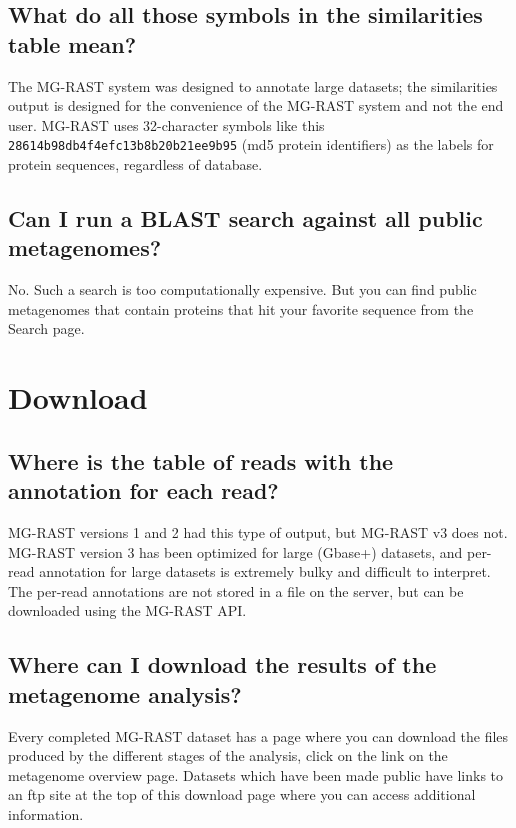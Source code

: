 \documentclass[12pt,fullpage]{report}
\begin{document}
\subsection{What do all those symbols in the similarities table mean?}
The MG-RAST system was designed to annotate large datasets;  the similarities output is designed for the convenience of the MG-RAST system and not the end user.   MG-RAST uses 32-character symbols like this \texttt{28614b98db4f4efc13b8b20b21ee9b95} (md5 protein identifiers) as the labels for protein sequences, regardless of database. 
\subsection{Can I run a BLAST search against all public metagenomes?}
No.   Such a search is too computationally expensive. But you can find public metagenomes that contain proteins that hit your favorite sequence from the Search page.
\section{Download}
\subsection{Where is the table of reads with the annotation for each read?}
MG-RAST versions 1 and 2 had this type of output, but MG-RAST v3 does not.   MG-RAST version 3 has been optimized for large (Gbase+) datasets, and per-read annotation for large datasets is extremely bulky and difficult to interpret. The per-read annotations are not stored in a file on the server, but can be downloaded using the MG-RAST API.
\subsection{Where can I download the results of the metagenome analysis?}
Every completed MG-RAST dataset has a page where you can download the files produced by the different stages of the analysis, click on the link on the metagenome overview page. Datasets which have been made public have links to an ftp site at the top of this download page where you can access additional information.
\end{document}
